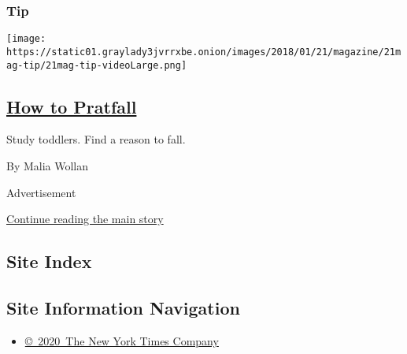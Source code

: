 \begin{enumerate}
{  \subsubsection{Tip}\label{tip}}

  \texttt{[image: https://static01.graylady3jvrrxbe.onion/images/2018/01/21/magazine/21mag-tip/21mag-tip-videoLarge.png]}

  \hypertarget{how-to-pratfall}{%
  \subsection{\texorpdfstring{\href{/2018/01/19/magazine/how-to-pratfall.html}{How
  to Pratfall}}{How to Pratfall}}\label{how-to-pratfall}}

  Study toddlers. Find a reason to fall.

  By Malia Wollan
\end{enumerate}

Advertisement

\protect\hyperlink{after-mid1}{Continue reading the main story}

\hypertarget{site-index}{%
\subsection{Site Index}\label{site-index}}

\hypertarget{site-information-navigation}{%
\subsection{Site Information
Navigation}\label{site-information-navigation}}

\begin{itemize}
\tightlist
\item
  \href{https://help.nytimes3xbfgragh.onion/hc/en-us/articles/115014792127-Copyright-notice}{©~2020~The
  New York Times Company}
\end{itemize}

